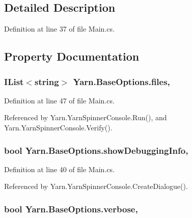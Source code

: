 \subsection{Detailed Description}


Definition at line 37 of file Main.\-cs.



\subsection{Property Documentation}
\hypertarget{a00035_aa93cbb1bc1d5328e0a417012621e92d2}{
\subsubsection[{files}]{\setlength{\rightskip}{0pt plus 5cm}I\-List$<$string$>$ Yarn.\-Base\-Options.\-files\hspace{0.3cm}{\ttfamily [get]}, {\ttfamily [set]}}}\label{a00035_aa93cbb1bc1d5328e0a417012621e92d2}


Definition at line 47 of file Main.\-cs.



Referenced by Yarn.\-Yarn\-Spinner\-Console.\-Run(), and Yarn.\-Yarn\-Spinner\-Console.\-Verify().

\hypertarget{a00035_a89964ea17bd19caf00cb5bff563ed01c}{
\subsubsection[{show\-Debugging\-Info}]{\setlength{\rightskip}{0pt plus 5cm}bool Yarn.\-Base\-Options.\-show\-Debugging\-Info\hspace{0.3cm}{\ttfamily [get]}, {\ttfamily [set]}}}\label{a00035_a89964ea17bd19caf00cb5bff563ed01c}


Definition at line 40 of file Main.\-cs.



Referenced by Yarn.\-Yarn\-Spinner\-Console.\-Create\-Dialogue().

\hypertarget{a00035_ada4d83d1756918f362d55f6649b82b17}{
\subsubsection[{verbose}]{\setlength{\rightskip}{0pt plus 5cm}bool Yarn.\-Base\-Options.\-verbose\hspace{0.3cm}{\ttfamily [get]}, {\ttfamily [set]}}}\label{a00035_ada4d83d1756918f362d55f6649b82b17}


